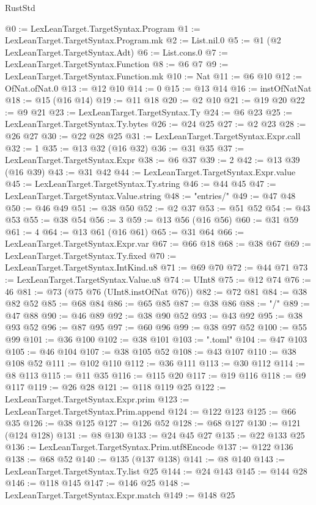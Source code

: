 \begin{lexlean}{RustStd}
\begin{coremodule}
@0 := LexLeanTarget.TargetSyntax.Program
@1 := LexLeanTarget.TargetSyntax.Program.mk
@2 := List.nil.{0}
@5 := @1 (@2 LexLeanTarget.TargetSyntax.Adt)
@6 := List.cons.{0}
@7 := LexLeanTarget.TargetSyntax.Function
@8 := @6 @7
@9 := LexLeanTarget.TargetSyntax.Function.mk
@10 := Nat
@11 := @6 @10
@12 := OfNat.ofNat.{0}
@13 := @12 @10
@14 := 0
@15 := @13 @14
@16 := instOfNatNat
@18 := @15 (@16 @14)
@19 := @11 @18
@20 := @2 @10
@21 := @19 @20
@22 := @9 @21
@23 := LexLeanTarget.TargetSyntax.Ty
@24 := @6 @23
@25 := LexLeanTarget.TargetSyntax.Ty.bytes
@26 := @24 @25
@27 := @2 @23
@28 := @26 @27
@30 := @22 @28 @25
@31 := LexLeanTarget.TargetSyntax.Expr.call
@32 := 1
@35 := @13 @32 (@16 @32)
@36 := @31 @35
@37 := LexLeanTarget.TargetSyntax.Expr
@38 := @6 @37
@39 := 2
@42 := @13 @39 (@16 @39)
@43 := @31 @42
@44 := LexLeanTarget.TargetSyntax.Expr.value
@45 := LexLeanTarget.TargetSyntax.Ty.string
@46 := @44 @45
@47 := LexLeanTarget.TargetSyntax.Value.string
@48 := "entries/"
@49 := @47 @48
@50 := @46 @49
@51 := @38 @50
@52 := @2 @37
@53 := @51 @52
@54 := @43 @53
@55 := @38 @54
@56 := 3
@59 := @13 @56 (@16 @56)
@60 := @31 @59
@61 := 4
@64 := @13 @61 (@16 @61)
@65 := @31 @64
@66 := LexLeanTarget.TargetSyntax.Expr.var
@67 := @66 @18
@68 := @38 @67
@69 := LexLeanTarget.TargetSyntax.Ty.fixed
@70 := LexLeanTarget.TargetSyntax.IntKind.u8
@71 := @69 @70
@72 := @44 @71
@73 := LexLeanTarget.TargetSyntax.Value.u8
@74 := UInt8
@75 := @12 @74
@76 := 46
@81 := @73 (@75 @76 (UInt8.instOfNat @76))
@82 := @72 @81
@84 := @38 @82 @52
@85 := @68 @84
@86 := @65 @85
@87 := @38 @86
@88 := "/"
@89 := @47 @88
@90 := @46 @89
@92 := @38 @90 @52
@93 := @43 @92
@95 := @38 @93 @52
@96 := @87 @95
@97 := @60 @96
@99 := @38 @97 @52
@100 := @55 @99
@101 := @36 @100
@102 := @38 @101
@103 := ".toml"
@104 := @47 @103
@105 := @46 @104
@107 := @38 @105 @52
@108 := @43 @107
@110 := @38 @108 @52
@111 := @102 @110
@112 := @36 @111
@113 := @30 @112
@114 := @8 @113
@115 := @11 @35
@116 := @115 @20
@117 := @19 @116
@118 := @9 @117
@119 := @26 @28
@121 := @118 @119 @25
@122 := LexLeanTarget.TargetSyntax.Expr.prim
@123 := LexLeanTarget.TargetSyntax.Prim.append
@124 := @122 @123
@125 := @66 @35
@126 := @38 @125
@127 := @126 @52
@128 := @68 @127
@130 := @121 (@124 @128)
@131 := @8 @130
@133 := @24 @45 @27
@135 := @22 @133 @25
@136 := LexLeanTarget.TargetSyntax.Prim.utf8Encode
@137 := @122 @136
@138 := @68 @52
@140 := @135 (@137 @138)
@141 := @8 @140
@143 := LexLeanTarget.TargetSyntax.Ty.list @25
@144 := @24 @143
@145 := @144 @28
@146 := @118 @145
@147 := @146 @25
@148 := LexLeanTarget.TargetSyntax.Expr.match
@149 := @148 @25

\end{coremodule}
\end{lexlean}
